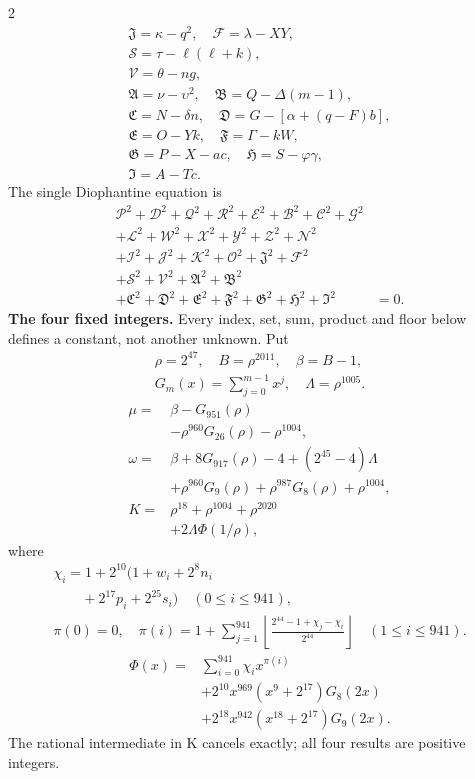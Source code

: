 \documentclass[10pt]{article}
\newcommand{\fl}[1]{\left\lfloor#1\right\rfloor}
\begin{document}
\begin{multicols}{2}
\[\begin{gathered}
\mathfrak{J}=\kappa-q^2,\quad\mathcal{F}=\lambda-XY,\\
\mathcal{S}=\tau-\ell(\ell+k),\\
\mathcal{V}=\theta-ng,\\
\mathfrak{A}=\nu-\upsilon^2,\quad\mathfrak{B}=Q-\Delta(m-1),\\
\mathfrak{C}=N-\delta n,\quad\mathfrak{D}=G-[\alpha+(q-F)b],\\
\mathfrak{E}=O-Yk,\quad\mathfrak{F}=\Gamma-kW,\\
\mathfrak{G}=P-X-ac,\quad\mathfrak{H}=S-\varphi\gamma,\\
\mathfrak{I}=A-Tc.
\end{gathered}
\]
The single Diophantine equation is
\[
\begin{split}
\mathcal{P}^2+\mathcal{D}^2+\mathcal{Q}^2+\mathcal{R}^2+\mathcal{E}^2+\mathcal{B}^2+\mathcal{C}^2+\mathcal{G}^2 &\\
+\mathcal{L}^2+\mathcal{W}^2+\mathcal{X}^2+\mathcal{Y}^2+\mathcal{Z}^2+\mathcal{N}^2 &\\
+\mathcal{I}^2+\mathcal{J}^2+\mathcal{K}^2+\mathcal{O}^2+\mathfrak{J}^2+\mathcal{F}^2 &\\
+\mathcal{S}^2+\mathcal{V}^2+\mathfrak{A}^2+\mathfrak{B}^2 &\\
+\mathfrak{C}^2+\mathfrak{D}^2+\mathfrak{E}^2+\mathfrak{F}^2+\mathfrak{G}^2+\mathfrak{H}^2+\mathfrak{I}^2 &= 0.
\end{split}
\]
\textbf{The four fixed integers.}
Every index, set, sum, product and floor below defines a constant, not
another unknown. Put
\[
\begin{gathered}
\rho=2^{47},\quad B=\rho^{2011},\quad\beta=B-1,\\
G_m(x)=\sum_{j=0}^{m-1}x^j,\quad
\Lambda=\rho^{1005}.
\end{gathered}
\]
\begin{align*}
\mu={}&\beta-G_{951}(\rho)\\
&-\rho^{960}G_{26}(\rho)-\rho^{1004},\\
\omega={}&\beta+8G_{917}(\rho)-4+(2^{45}-4)\Lambda\\
&+\rho^{960}G_9(\rho)+\rho^{987}G_8(\rho)
  +\rho^{1004},\\
K={}&\rho^{18}+\rho^{1004}+\rho^{2020}\\
&+2\Lambda\Phi(1/\rho),
\end{align*}
where
\[
\begin{gathered}
\chi_i=1+2^{10}(1+w_i+2^8n_i\\
\qquad+2^{17}p_i+2^{25}s_i)\quad(0\le i\le941),\\
\pi(0)=0,\quad\pi(i)=1+\sum_{j=1}^{941}
\fl{\frac{2^{44}-1+\chi_j-\chi_i}{2^{44}}}\quad(1\le i\le941).
\end{gathered}
\]
\[
\begin{split}
\Phi(x)={}&\sum_{i=0}^{941}\chi_i x^{\pi(i)}\\
&+2^{10}x^{969}(x^9+2^{17})G_8(2x)\\
&+2^{18}x^{942}(x^{18}+2^{17})G_9(2x).
\end{split}
\]
The rational intermediate in K cancels exactly; all four results are positive integers.


\end{multicols}
\end{document}
